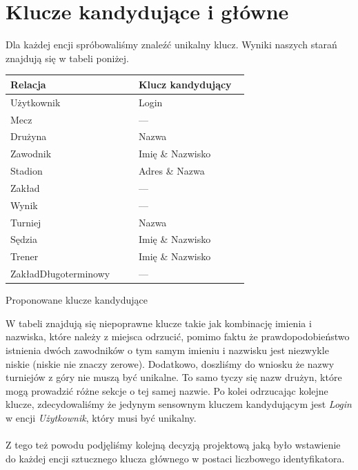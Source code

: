 \documentclass{mwrep}[15pt]
\begin{document}
\section{Klucze kandydujące i główne}

Dla każdej encji spróbowaliśmy znaleźć unikalny klucz. Wyniki naszych starań znajdują się w
tabeli poniżej.

\vspace{1cm}
\begin{threeparttable}[H]
	\begin{tabular}{|p{0.5\linewidth}|p{0.43\linewidth}|}
	\hline
	Relacja & Klucz kandydujący \\ \hline
	Użytkownik & Login \\ \hline
	Mecz &  \hfil--- \\ \hline
	Drużyna &  Nazwa \\ \hline
	Zawodnik &  Imię \& Nazwisko \\ \hline
	Stadion &  Adres \& Nazwa \\ \hline
	Zakład &  \hfil--- \\ \hline
	Wynik &  \hfil--- \\ \hline
	Turniej &  Nazwa \\ \hline
	Sędzia & Imię \& Nazwisko \\ \hline
	Trener & Imię \& Nazwisko \\ \hline
	ZakładDługoterminowy &  \hfil--- \\ \hline
	\end{tabular}	
	\caption{Proponowane klucze kandydujące}
\end{threeparttable}
\vspace{1cm}

W tabeli znajdują się niepoprawne klucze takie jak kombinację imienia i nazwiska, które należy z miejsca odrzucić, pomimo faktu że prawdopodobieństwo
istnienia dwóch zawodników o tym samym imieniu i nazwisku jest niezwykle niskie (niskie nie znaczy zerowe). 
Dodatkowo, doszliśmy do wniosku że nazwy turniejów z góry nie muszą być unikalne. To samo tyczy się nazw drużyn, które mogą
prowadzić różne sekcje o tej samej nazwie. Po kolei odrzucając kolejne klucze, zdecydowaliśmy że jedynym sensownym kluczem kandydującym
jest \emph{Login} w encji \emph{Użytkownik}, który musi być unikalny. \\
\\
Z tego też powodu podjęliśmy kolejną decyzją projektową jaką było wstawienie do każdej encji sztucznego klucza głównego 
w postaci liczbowego identyfikatora. 
\end{document}
